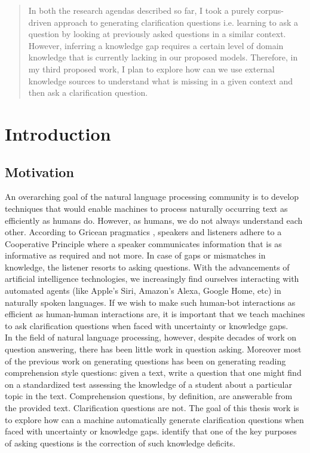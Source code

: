 \documentclass[11pt]{report}
\renewcommand\cite{\citep}	%
\begin{document}
\begin{abstract}
In both the research agendas described so far, I took a purely corpus-driven approach to generating clarification questions i.e. learning to ask a question by looking at previously asked questions in a similar context. However, inferring a knowledge gap requires a certain level of domain knowledge that is currently lacking in our proposed models. Therefore, in my third proposed work, I plan to explore how can we use external knowledge sources to understand what is missing in a given context and then ask a clarification question. 

\end{abstract}

\pagebreak

\tableofcontents
\pagebreak

\cleardoublepage
{}


\chapter{Introduction}

\section{Motivation}

An overarching goal of the natural language processing community is to develop techniques that would enable machines to process naturally occurring text as efficiently as humans do. However, as humans, we do not always understand each other. According to Gricean pragmatics \cite{grice1975logic}, speakers and listeners adhere to a Cooperative Principle where a speaker communicates information that is as informative as required and not more. In case of gaps or mismatches in knowledge, the listener resorts to asking questions. With the advancements of artificial intelligence technologies, we increasingly find ourselves interacting with automated agents (like Apple's Siri, Amazon's Alexa, Google Home, etc) in naturally spoken languages. If we wish to make such human-bot interactions as efficient as human-human interactions are, it is important that we teach machines to ask clarification questions when faced with uncertainty or knowledge gaps.\\

\noindent
In the field of natural language processing, however, despite decades of work on question answering, there has been little work in question asking. Moreover most of the previous work on generating questions has been on generating reading comprehension style questions: given a text, write a question that one might find on a standardized test assessing the knowledge of a student about a particular topic in the text. Comprehension questions, by definition, are answerable from the provided text. Clarification questions are not. The goal of this thesis work is to explore how can a machine automatically generate clarification questions when faced with uncertainty or knowledge gaps. \cite{graesser2008question} identify that one of the key purposes of asking questions is the correction of such knowledge deficits.
\end{document}
